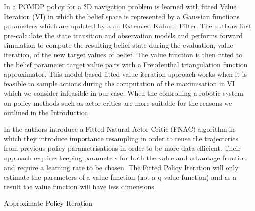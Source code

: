 \documentclass[final,5p,times,twocolumn]{elsarticle}
\begin{document}
In \cite{PPOMDP_2006} a POMDP policy for a 2D navigation problem is learned with fitted Value Iteration (VI) in which the belief space is represented by 
a Gaussian functions parameters which are updated by a an Extended Kalman Filter. The authors first pre-calculate the state transition and observation models 
and performs forward simulation to compute the resulting belief state during the evaluation, value iteration, of the new target values of belief. The value 
function is then fitted to the belief parameter target value pairs with a Freudenthal triangulation function approximator. This model based fitted value iteration 
approach works when it is feasible to sample actions during the computation of the maximisation in VI which we consider infeasible in our case. When the controlling 
a robotic system on-policy methods such as actor critics are more suitable for the reasons we outlined in the Introduction.

In \cite{Melo2008} the authors introduce a Fitted Natural Actor Critic (FNAC) algorithm in which they introduce importance 
resampling in order to reuse the trajectories from previous policy parametrisations in order to be more data efficient. Their approach requires keeping 
parameters for both the value and advantage function and require a learning rate to be chosen. The Fitted Policy Iteration will only estimate the parameters 
of a value function (not a q-value function) and as a result the value function will have less dimensions.


Approximate Policy Iteration 

\cite{LSPI_2003} %


\cite{Jodogne2006} 	%
\end{document}
